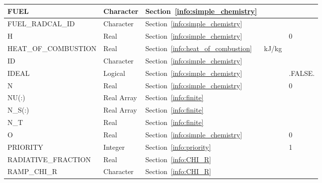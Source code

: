 \documentclass[11pt]{book}
\begin{document}
\begin{longtable}{@{\extracolsep{\fill}}|l|l|l|l|l|}
{\ct FUEL}                                & Character   & Section~\ref{info:simple_chemistry}       &                   &                   \\ \hline
{\ct FUEL\_RADCAL\_ID}                    & Character   & Section~\ref{info:simple_chemistry}       &                   &                   \\ \hline
{\ct H}                                   & Real        & Section~\ref{info:simple_chemistry}       &                   & 0                 \\ \hline
{\ct HEAT\_OF\_COMBUSTION}                & Real        & Section~\ref{info:heat_of_combustion}     & kJ/kg             &                   \\ \hline
{\ct ID}                                  & Character   & Section~\ref{info:simple_chemistry}       &                   &                   \\ \hline
{\ct IDEAL}                               & Logical     & Section~\ref{info:simple_chemistry}       &                   & {\ct .FALSE.}     \\ \hline
{\ct N}                                   & Real        & Section~\ref{info:simple_chemistry}       &                   & 0                 \\ \hline
{\ct NU(:)}                               & Real Array  & Section~\ref{info:finite}                 &                   &                   \\ \hline
{\ct N\_S(:)}                             & Real Array  & Section~\ref{info:finite}                 &                   &                   \\ \hline
{\ct N\_T}                                & Real        & Section~\ref{info:finite}                 &                   &                   \\ \hline
{\ct O}                                   & Real        & Section~\ref{info:simple_chemistry}       &                   & 0                 \\ \hline
{\ct PRIORITY}                            & Integer     & Section~\ref{info:priority}               &                   & 1                 \\ \hline
{\ct RADIATIVE\_FRACTION}                 & Real        & Section~\ref{info:CHI_R}                  &                   &                   \\ \hline
{\ct RAMP\_CHI\_R}                        & Character   & Section~\ref{info:CHI_R}                  &                   &                   \\ \hline

\end{longtable}
\end{document}
